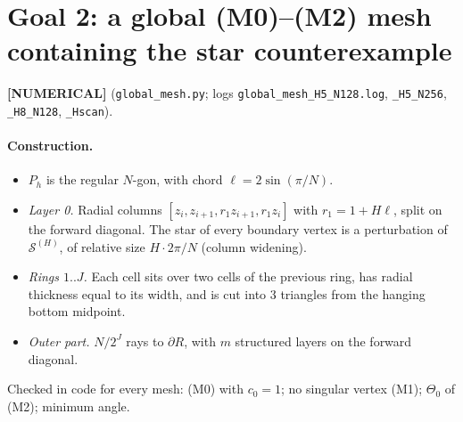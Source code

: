 \documentclass[11pt]{article}
\theoremstyle{remark}\newtheorem{remark}[theorem]{Remark}
\newcommand{\lab}[1]{\textbf{[#1]}}
\newcommand{\cS}{\mathcal S}\renewcommand{\div}{\operatorname{div}}
\begin{document}
\section{Goal 2: a global (M0)--(M2) mesh containing the star counterexample}\label{sec:global}
\lab{NUMERICAL} (\texttt{global\_mesh.py}; logs \texttt{global\_mesh\_H5\_N128.log}, \texttt{\_H5\_N256},
\texttt{\_H8\_N128}, \texttt{\_Hscan}).
\paragraph{Construction.}
\begin{itemize}
\item $P_h$ is the regular $N$-gon, with chord $\ell=2\sin(\pi/N)$.
\item \emph{Layer 0.} Radial columns $[z_i,z_{i+1},r_1z_{i+1},r_1z_i]$ with $r_1=1+H\ell$, split on the forward diagonal. The
  star of every boundary vertex is a perturbation of $\cS^{(H)}$, of relative size $H\cdot2\pi/N$ (column widening).
\item \emph{Rings $1..J$.} Each cell sits over two cells of the previous ring, has radial thickness equal to its width, and is
  cut into 3 triangles from the hanging bottom midpoint.
\item \emph{Outer part.} $N/2^J$ rays to $\partial R$, with $m$ structured layers on the forward diagonal.
\end{itemize}
Checked in code for every mesh: (M0) with $c_0=1$; no singular vertex (M1); $\Theta_0$ of (M2); minimum angle.
\end{document}
